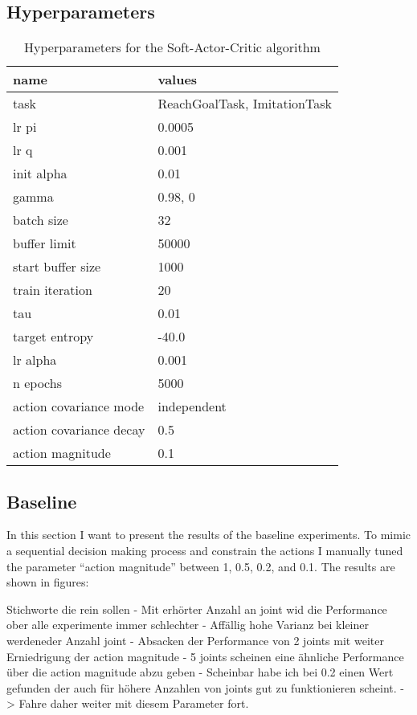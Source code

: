\subsection{Hyperparameters}

\begin{table}[]
    \centering
    \begin{tabular}{l|l}
         name & values \\
         \hline
         task & ReachGoalTask, ImitationTask \\
         lr pi & 0.0005 \\
         lr q & 0.001 \\
         init alpha & 0.01 \\
         gamma & 0.98, 0  \\
         batch size & 32 \\
         buffer limit & 50000 \\
         start buffer size & 1000 \\
         train iteration & 20 \\
         tau & 0.01 \\ 
         target entropy & -40.0 \\
         lr alpha & 0.001 \\
         n epochs & 5000 \\
         action covariance mode & independent \\
         action covariance decay &  0.5 \\
         action magnitude & 0.1 \\
        \end{tabular}
    \caption{Hyperparameters for the Soft-Actor-Critic algorithm}
    \label{tab:Hyperparameters}
\end{table}

\subsection{Baseline}

In this section I want to present the results of the baseline experiments. To mimic a sequential decision making process and constrain the actions I manually tuned the parameter ``action magnitude'' between 1, 0.5, 0.2, and 0.1. The results are shown in figures: \figref{}

Stichworte die rein sollen
- Mit erhörter Anzahl an joint wid die Performance ober alle experimente immer schlechter
- Affällig hohe Varianz bei kleiner werdeneder Anzahl joint
- Absacken der Performance von 2 joints mit weiter Erniedrigung der action magnitude
- 5 joints scheinen eine ähnliche Performance über die action magnitude abzu geben
- Scheinbar habe ich bei 0.2 einen Wert gefunden der auch für höhere Anzahlen von joints gut zu funktionieren scheint. -> Fahre daher weiter mit diesem Parameter fort.



